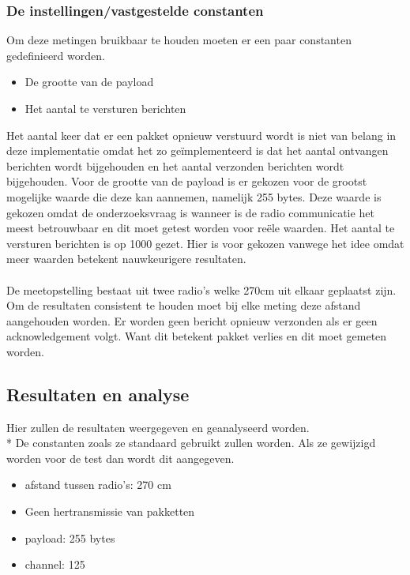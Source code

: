 \documentclass{article}
\begin{document}
\subsubsection{De instellingen/vastgestelde constanten}
Om deze metingen bruikbaar te houden moeten er een paar constanten gedefinieerd worden.
\begin{itemize}
	\item De grootte van de payload
	\item Het aantal te versturen berichten
\end{itemize}
Het aantal keer dat er een pakket opnieuw verstuurd wordt is niet van belang in deze implementatie omdat het zo ge\"{i}mplementeerd is dat het aantal ontvangen berichten wordt bijgehouden en het aantal verzonden berichten wordt bijgehouden. 
Voor de grootte van de payload is er gekozen voor de grootst mogelijke waarde die deze kan aannemen, namelijk 255 bytes. Deze waarde is gekozen omdat de onderzoeksvraag is wanneer is de radio communicatie het meest betrouwbaar en dit moet getest worden voor re\"{e}le waarden. 
Het aantal te versturen berichten is op 1000 gezet. Hier is voor gekozen vanwege het idee omdat meer waarden betekent nauwkeurigere resultaten.
\\
\\
De meetopstelling bestaat uit twee radio's welke 270cm uit elkaar geplaatst zijn. Om de resultaten consistent te houden moet bij elke meting deze afstand aangehouden worden. 
Er worden geen bericht opnieuw verzonden als er geen acknowledgement volgt. Want dit betekent pakket verlies en dit moet gemeten worden. 

\subsection{Resultaten en analyse}
Hier zullen de resultaten weergegeven en geanalyseerd worden. \\*
  De constanten zoals ze standaard gebruikt zullen worden. Als ze gewijzigd worden voor de test dan wordt dit aangegeven. 
  \begin{itemize}
  	\item afstand tussen radio's: 270 cm
  	\item Geen hertransmissie van pakketten
  	\item payload: 255 bytes
  	\item channel: 125
  \end{itemize}
  
\end{document}
